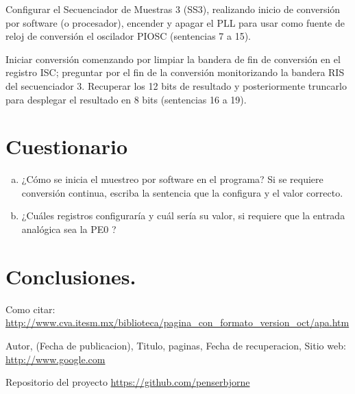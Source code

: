 \documentclass[a4paper,11pt]{article}                 %
\begin{document}
Configurar el Secuenciador de Muestras 3 (SS3), realizando inicio de conversión por software (o procesador), encender y apagar el PLL para usar como fuente de reloj de conversión el oscilador PIOSC (sentencias 7 a 15). 

Iniciar conversión comenzando por limpiar la bandera de fin de conversión en el registro ISC; preguntar por el fin de la conversión monitorizando la bandera RIS del secuenciador 3. Recuperar los 12 bits de resultado y posteriormente truncarlo para desplegar el resultado en 8 bits (sentencias 16 a 19). 



 
  \section{Cuestionario}
   
  
  \begin{enumerate}[a)]

  	\item ¿Cómo se inicia el muestreo por software en el programa? Si se requiere conversión continua, escriba la sentencia que la configura y el valor correcto. 
  	\item ¿Cuáles registros configuraría y cuál sería su valor, si requiere que la entrada analógica sea la PE0 ?
  	  
  \end{enumerate}




\section{Conclusiones.}
  \begin{thebibliography}{}                           %
      Como citar: \url{http://www.cva.itesm.mx/biblioteca/pagina_con_formato_version_oct/apa.htm} %

      Autor,
      (Fecha de publicacion),
      Titulo, paginas,
      Fecha de recuperacion,
      Sitio web: \url{http://www.google.com}

      Repositorio del proyecto \url{https://github.com/penserbjorne}
  \end{thebibliography}

\end{document}
